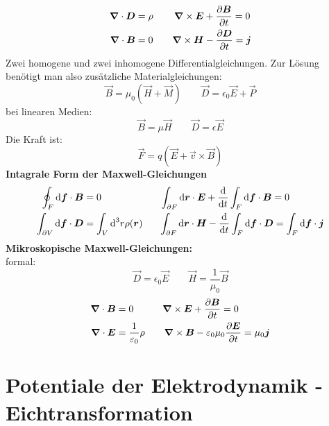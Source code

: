 \begin{align*}
\bm{\nabla} \cdot \bm{D} &= \rho \qquad \, \bm{\nabla} \times \bm{E} + \frac{\partial \bm{B}}{\partial t} = 0 \\
\bm{\nabla} \cdot \bm{B} &= 0 \qquad \bm{\nabla} \times \bm{H} - \frac{\partial \bm{D}}{\partial t} = \bm{j}
\end{align*}
Zwei homogene und zwei inhomogene Differentialgleichungen. Zur Lösung benötigt man also zusätzliche Materialgleichungen:
\begin{equation*}
\vec{B} = \mu_0 (\vec{H} + \vec{M}) \qquad \vec{D} = \epsilon_0\vec{E} + \vec{P}
\end{equation*}
bei linearen Medien:
\begin{equation*}
\vec{B} = \mu \vec{H} \qquad \vec{D} = \epsilon \vec{E}
\end{equation*}
Die Kraft ist:
\begin{equation*}
\vec{F} = q (\vec{E} + \vec{v} \times \vec{B})
\end{equation*}
\textbf{Intagrale Form der Maxwell-Gleichungen}
\begin{align*}
\oint_F \textrm{d} \bm{f} \cdot \bm{B} &= 0  \qquad \qquad \qquad \int_{\partial F} \textrm{d} \bm{r} \cdot \bm{E} + \frac{\textrm{d} }{\textrm{d} t} \int_F \textrm{d} \bm{f} \cdot \bm{B} = 0 \\
\int_{\partial V} \textrm{d} \bm{f} \cdot \bm{D} &= \int_V \textrm{d}^3 r \rho(\bm{r}) \quad \ \ \int_{\partial F} \textrm{d} \bm{r} \cdot \bm{H} - \frac{\textrm{d} }{\textrm{d} t} \int_F \textrm{d} \bm{f} \cdot \bm{D} = \int_F \textrm{d} \bm{f} \cdot \bm{j}
\end{align*}
\textbf{Mikroskopische Maxwell-Gleichungen:}\\
formal:
\begin{equation*}
\vec{D} = \epsilon_0 \vec{E} \qquad \vec{H} = \frac{1}{\mu_0} \vec{B}
\end{equation*}
\begin{align*}
\bm{\nabla} \cdot \bm{B} &= 0 \qquad \quad \bm{\nabla} \times \bm{E} + \frac{\partial \bm{B}}{\partial t} = 0\\
\bm{\nabla} \cdot \bm{E} &= \frac{1}{\varepsilon_0} \rho \qquad \bm{\nabla} \times \bm{B} - \varepsilon_0 \mu_0 \frac{\partial \bm{E}}{\partial t} = \mu_0 \bm{j}
\end{align*}

\section{Potentiale der Elektrodynamik - Eichtransformation}

